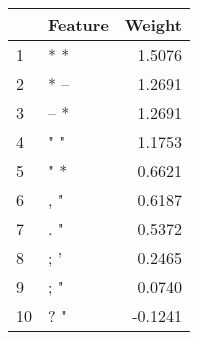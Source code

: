 \begin{tabular}{llr}
\toprule
{} & Feature &  Weight \\
\midrule
1  &     * * &  1.5076 \\
2  &    * -- &  1.2691 \\
3  &    -- * &  1.2691 \\
4  &     " " &  1.1753 \\
5  &     " * &  0.6621 \\
6  &     , " &  0.6187 \\
7  &     . " &  0.5372 \\
8  &     ; ' &  0.2465 \\
9  &     ; " &  0.0740 \\
10 &     ? " & -0.1241 \\
\bottomrule
\end{tabular}
